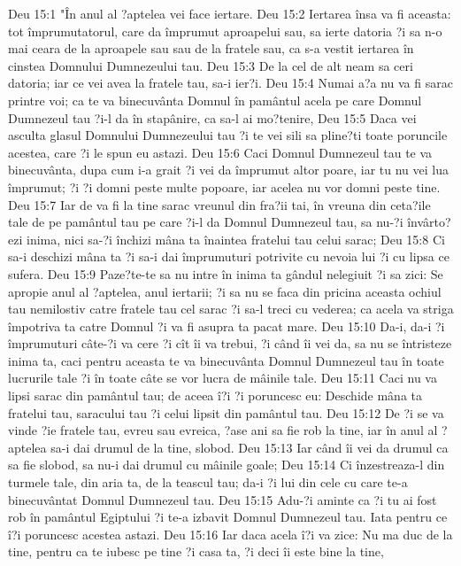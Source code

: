 Deu 15:1  "În anul al ?aptelea vei face iertare.
Deu 15:2  Iertarea însa va fi aceasta: tot împrumutatorul, care da împrumut aproapelui sau, sa ierte datoria ?i sa n-o mai ceara de la aproapele sau sau de la fratele sau, ca s-a vestit iertarea în cinstea Domnului Dumnezeului tau.
Deu 15:3  De la cel de alt neam sa ceri datoria; iar ce vei avea la fratele tau, sa-i ier?i.
Deu 15:4  Numai a?a nu va fi sarac printre voi; ca te va binecuvânta Domnul în pamântul acela pe care Domnul Dumnezeul tau ?i-l da în stapânire, ca sa-l ai mo?tenire,
Deu 15:5  Daca vei asculta glasul Domnului Dumnezeului tau ?i te vei sili sa pline?ti toate poruncile acestea, care ?i le spun eu astazi.
Deu 15:6  Caci Domnul Dumnezeul tau te va binecuvânta, dupa cum i-a grait ?i vei da împrumut altor poare, iar tu nu vei lua împrumut; ?i ?i domni peste multe popoare, iar acelea nu vor domni peste tine.
Deu 15:7  Iar de va fi la tine sarac vreunul din fra?ii tai, în vreuna din ceta?ile tale de pe pamântul tau pe care ?i-l da Domnul Dumnezeul tau, sa nu-?i învârto?ezi inima, nici sa-?i închizi mâna ta înaintea fratelui tau celui sarac;
Deu 15:8  Ci sa-i deschizi mâna ta ?i sa-i dai împrumuturi potrivite cu nevoia lui ?i cu lipsa ce sufera.
Deu 15:9  Paze?te-te sa nu intre în inima ta gândul nelegiuit ?i sa zici: Se apropie anul al ?aptelea, anul iertarii; ?i sa nu se faca din pricina aceasta ochiul tau nemilostiv catre fratele tau cel sarac ?i sa-l treci cu vederea; ca acela va striga împotriva ta catre Domnul ?i va fi asupra ta pacat mare.
Deu 15:10  Da-i, da-i ?i împrumuturi câte-?i va cere ?i cît îi va trebui, ?i când îi vei da, sa nu se întristeze inima ta, caci pentru aceasta te va binecuvânta Domnul Dumnezeul tau în toate lucrurile tale ?i în toate câte se vor lucra de mâinile tale.
Deu 15:11  Caci nu va lipsi sarac din pamântul tau; de aceea î?i ?i poruncesc eu: Deschide mâna ta fratelui tau, saracului tau ?i celui lipsit din pamântul tau.
Deu 15:12  De ?i se va vinde ?ie fratele tau, evreu sau evreica, ?ase ani sa fie rob la tine, iar în anul al ?aptelea sa-i dai drumul de la tine, slobod.
Deu 15:13  Iar când îi vei da drumul ca sa fie slobod, sa nu-i dai drumul cu mâinile goale;
Deu 15:14  Ci înzestreaza-l din turmele tale, din aria ta, de la teascul tau; da-i ?i lui din cele cu care te-a binecuvântat Domnul Dumnezeul tau.
Deu 15:15  Adu-?i aminte ca ?i tu ai fost rob în pamântul Egiptului ?i te-a izbavit Domnul Dumnezeul tau. Iata pentru ce î?i poruncesc acestea astazi.
Deu 15:16  Iar daca acela î?i va zice: Nu ma duc de la tine, pentru ca te iubesc pe tine ?i casa ta, ?i deci îi este bine la tine,

